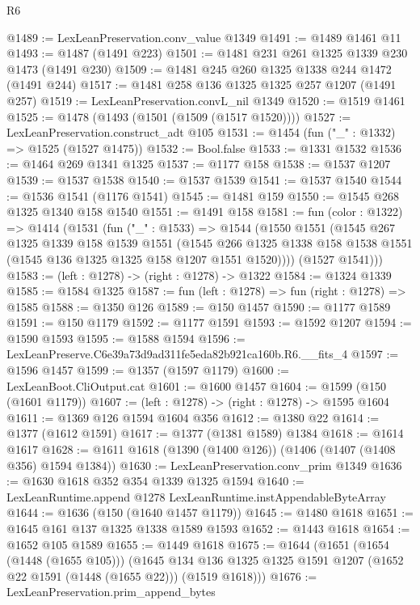 \begin{lexlean}{R6}
\begin{coremodule}
@1489 := LexLeanPreservation.conv_value @1349
@1491 := @1489 @1461 @11
@1493 := @1487 (@1491 @223)
@1501 := @1481 @231 @261 @1325 @1339 @230 @1473 (@1491 @230)
@1509 := @1481 @245 @260 @1325 @1338 @244 @1472 (@1491 @244)
@1517 := @1481 @258 @136 @1325 @1325 @257 @1207 (@1491 @257)
@1519 := LexLeanPreservation.convL_nil @1349
@1520 := @1519 @1461
@1525 := @1478 (@1493 (@1501 (@1509 (@1517 @1520))))
@1527 := LexLeanPreservation.construct_adt @105
@1531 := @1454 (fun ("_" : @1332) => @1525 (@1527 @1475))
@1532 := Bool.false
@1533 := @1331 @1532
@1536 := @1464 @269 @1341 @1325
@1537 := @1177 @158
@1538 := @1537 @1207
@1539 := @1537 @1538
@1540 := @1537 @1539
@1541 := @1537 @1540
@1544 := @1536 @1541 (@1176 @1541)
@1545 := @1481 @159
@1550 := @1545 @268 @1325 @1340 @158 @1540
@1551 := @1491 @158
@1581 := fun (color : @1322) =>
  @1414
    (@1531
      (fun ("_" : @1533) =>
      @1544
        (@1550
          @1551
          (@1545
            @267
            @1325
            @1339
            @158
            @1539
            @1551
            (@1545
              @266
              @1325
              @1338
              @158
              @1538
              @1551
              (@1545 @136 @1325 @1325 @158 @1207 @1551 @1520))))
        (@1527 @1541)))
@1583 := (left : @1278) -> (right : @1278) -> @1322
@1584 := @1324 @1339
@1585 := @1584 @1325
@1587 := fun (left : @1278) => fun (right : @1278) => @1585
@1588 := @1350 @126
@1589 := @150 @1457
@1590 := @1177 @1589
@1591 := @150 @1179
@1592 := @1177 @1591
@1593 := @1592 @1207
@1594 := @1590 @1593
@1595 := @1588 @1594
@1596 := LexLeanPreserve.C6e39a73d9ad311fe5eda82b921ca160b.R6.__fits_4
@1597 := @1596 @1457
@1599 := @1357 (@1597 @1179)
@1600 := LexLeanBoot.CliOutput.cat
@1601 := @1600 @1457
@1604 := @1599 (@150 (@1601 @1179))
@1607 := (left : @1278) -> (right : @1278) -> @1595 @1604
@1611 := @1369 @126 @1594 @1604 @356
@1612 := @1380 @22
@1614 := @1377 (@1612 @1591)
@1617 := @1377 (@1381 @1589) @1384
@1618 := @1614 @1617
@1628 := @1611 @1618 (@1390 (@1400 @126)) (@1406 (@1407 (@1408 @356) @1594 @1384))
@1630 := LexLeanPreservation.conv_prim @1349
@1636 := @1630 @1618 @352 @354 @1339 @1325 @1594
@1640 := LexLeanRuntime.append @1278 LexLeanRuntime.instAppendableByteArray
@1644 := @1636 (@150 (@1640 @1457 @1179))
@1645 := @1480 @1618
@1651 := @1645 @161 @137 @1325 @1338 @1589 @1593
@1652 := @1443 @1618
@1654 := @1652 @105 @1589
@1655 := @1449 @1618
@1675 := @1644
    (@1651
      (@1654 (@1448 (@1655 @105)))
      (@1645 @134 @136 @1325 @1325 @1591 @1207 (@1652 @22 @1591 (@1448 (@1655 @22))) (@1519 @1618)))
@1676 := LexLeanPreservation.prim_append_bytes

\end{coremodule}
\end{lexlean}
